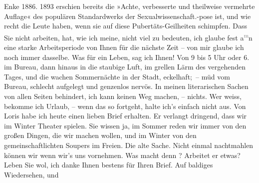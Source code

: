 \begin{ledgroupsized}[t]{13cm}
{{{{                        Enke}{ }1886. 1893 erschien bereits die »Achte, verbesserte und theilweise
                  vermehrte Auflage« des populären Standardwerks der Sexualwissenschaft.}}}\label{K_L03123-6h}-pose
               ist, und wie recht die Leute haben, wenn sie auf diese Pubertäts-Geilheiten
               schimpfen.\pend
           \pstart
           Dass Sie nicht arbeiten, hat, wie ich meine, nicht viel zu bedeuten, ich glaube fest a\substVorne{}\textsuperscript{\textcolor{gray}{m}}\substDazwischen{}n\substHinten{} eine starke Arbeitsperiode von Ihnen für die nächste Zeit – von mir glaube
               ich noch immer dasselbe.\pend
           \pstart
           Was für ein Leben, sag ich Ihnen! Von 9 bis 5 Uhr oder 6. im Bureau, dann hinaus in die staubige Luft,
               im grellen Lärm des vergehenden Tages, und die wachen Sommernächte in der Stadt, eckelhaft; – müd vom Bureau, schlecht aufgelegt und
               genzenlos nervös. In meinen literarischen Sachen von {\pb}allen Seiten behindert,
               ich kann keinen Weg machen, – nichts. Wer weiss, bekomme ich Urlaub, – wenn das so
               fortgeht, halte ich’s einfach nicht aus.\pend
           \pstart
           Von Loris habe ich heute einen lieben Brief erhalten. Er verlangt dringend, dass wir im
               Winter Theater spielen. Sie wissen ja, im Sommer reden wir immer von den großen
               Dingen, die wir machen wollen, und im Winter von den gemeinschaftlichten Soupers im
               Freien. Die alte Sache. Nicht einmal nachtmahlen können wir wenn wir’s uns
                  vornehmen.\hspace*{2.5em} Was macht denn \label{K_L03123-7v}\label{K_L03123-7h}? Arbeitet er etwas?\pend
           \pstart
           Leben Sie wol, ich danke Ihnen bestens für Ihren Brief. Auf baldiges Wiedersehen, und

\end{ledgroupsized}
